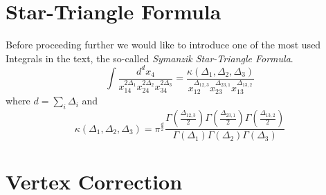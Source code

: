 \documentclass[12pt,a4paper,oneside]{book}
\theoremstyle{definition}
\begin{document}
    \section{Star-Triangle Formula}\label{startriangle}
    Before proceeding further we would like to introduce one of the most used Integrals in the text, the so-called \emph{Symanzik Star-Triangle Formula}\cite{symanzik}.
    \begin{equation}
        \boxed{
        \int \frac{d^{d}x_4}{x_{14}^{2\Delta_1}x_{24}^{2\Delta_2}x_{34}^{2\Delta_3}} = \frac{\kappa(\Delta_1,\Delta_2,\Delta_3)}{x_{12}^{\Delta_{12,3}}x_{23}^{\Delta_{23,1}}x_{13}^{\Delta_{13,2}}}}
    \end{equation}
    where $d = \sum_{i} \Delta_i$ and
    \begin{equation}
        \kappa(\Delta_1,\Delta_2,\Delta_3) = \pi^{\frac{d}{2}}\frac{\Gamma(\frac{\Delta_{12,3}}{2})\Gamma(\frac{\Delta_{23,1}}{2})\Gamma(\frac{\Delta_{13,2}}{2})}{\Gamma(\Delta_1)\Gamma(\Delta_2)\Gamma(\Delta_3)}
    \end{equation}
    \section{Vertex Correction}\label{vertex}
\end{document}
